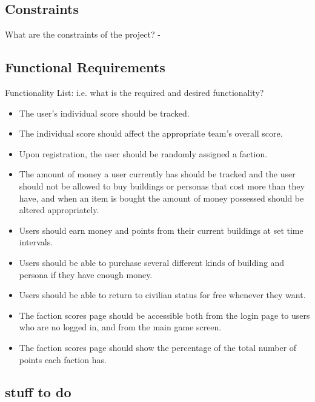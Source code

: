 \documentclass{sig-alt-release2}
\begin{document}
\subsection{Constraints}

What are the constraints of the project?
-

\subsection{Functional Requirements}

Functionality List: i.e. what is the required and desired functionality?

\begin{itemize}

\item The user's individual score should be tracked.

\item The individual score should affect the appropriate team's overall score.

\item Upon registration, the user should be randomly assigned a faction.

\item The amount of money a user currently has should be tracked and the user should not be allowed to buy buildings or personas that cost more than they have, and when an item is bought the amount of money possessed should be altered appropriately.

\item Users should earn money and points from their current buildings at set time intervals.

\item Users should be able to purchase several different kinds of building and persona if they have enough money.

\item Users should be able to return to civilian status for free whenever they want.

\item The faction scores page should be accessible both from the login page to users who are no logged in, and from the main game screen.

\item The faction scores page should show the percentage of the total number of points each faction has.

\end{itemize}

\subsection{stuff to do} 
\end{document}
